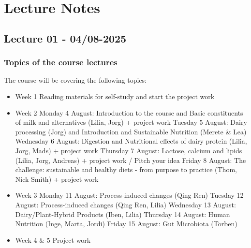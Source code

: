 \setcounter{chapter}{0}
\setcounter{section}{0}
\chapter{Lecture Notes}
\setlength{\headheight}{12.71342pt}
\addtolength{\topmargin}{-0.71342pt}

\section{Lecture 01 - 04/08-2025}
\subsection*{Topics of the course lectures}
The course will be covering the following topics:
\begin{itemize}
    \item Week 1
    \subitem Reading materials for self-study and start the project work
    \item Week 2
    \subitem Monday 4 August: Introduction to the course and Basic constituents of milk and alternatives (Lilia, 
    \subitem Jorg) + project work
    \subitem Tuesday 5 August: Dairy processing (Jorg) and Introduction and Sustainable Nutrition (Merete \& Lea)
    \subitem Wednesday 6 August: Digestion and Nutritional effects of dairy protein (Lilia, Jorg, Mads) + project \subitem work
    \subitem Thursday 7 August: Lactose, calcium and lipids (Lilia, Jorg, Andreas) + project work / Pitch your idea
    \subitem Friday 8 August: The challenge: sustainable and healthy diets - from purpose to practice (Thom, Nick \subitem Smith) + project work
    \item Week 3
    \subitem Monday 11 August: Process-induced changes (Qing Ren)
    \subitem Tuesday 12 August: Process-induced changes (Qing Ren, Lilia)
    \subitem Wednesday 13 August: Dairy/Plant-Hybrid Products (Iben, Lilia)
    \subitem Thursday 14 August: Human Nutrition (Inge, Marta, Jordi)
    \subitem Friday 15 August: Gut Microbiota (Torben)
    \item Week 4 \& 5
    \subitem Project work
\end{itemize}

